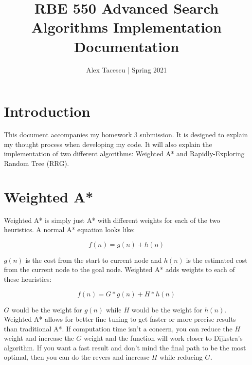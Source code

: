 \documentclass[journal]{IEEEtran}
\title{RBE 550 Advanced Search Algorithms Implementation Documentation}
\author{Alex Tacescu | Spring 2021
}
\begin{document}
    \maketitle

    \section{Introduction}
    This document accompanies my homework 3 submission. It is designed to explain my thought process when developing my code. It will also explain the implementation of two different algorithms: Weighted A* and Rapidly-Exploring Random Tree (RRG).

    \section{Weighted A*}

    Weighted A* is simply just A* with different weights for each of the two heuristics. A normal A* equation looks like: 

    \begin{equation}
        f(n) = g(n) + h(n)
    \end{equation}

    \(g(n)\) is the cost from the start to current node and \(h(n)\) is the estimated cost from the current node to the goal node. Weighted A* adds weights to each of these heuristics:
    
    \begin{equation}
        f(n) = G * g(n) + H * h(n)
    \end{equation}

    \(G\) would be the weight for \(g(n)\) while \(H\) would be the weight for \(h(n)\). Weighted A* allows for better fine tuning to get faster or more precise results than traditional A*. If computation time isn't a concern, you can reduce the \(H\) weight and increase the \(G\) weight and the function will work closer to Dijkstra's algorithm. If you want a fast result and don't mind the final path to be the most optimal, then you can do the revers and increase \(H\) while reducing \(G\).
    
\end{document}
